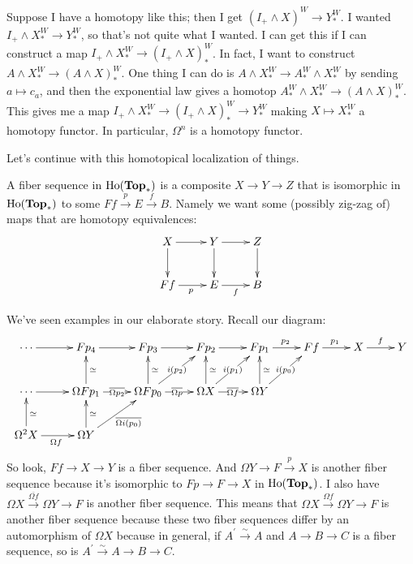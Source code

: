 Suppose I have a homotopy like this; then I get $(I_+\wedge X)^W\to Y^W_\ast$. I wanted $I_+\wedge X^W_\ast\to Y^W_\ast$, so that's not quite what I wanted. I can get this if I can construct a map $I_+\wedge X^W_\ast\to (I_+\wedge X)^W_\ast$. In fact, I want to construct $A\wedge X^W_\ast\to (A\wedge X)^W_\ast$. One thing I can do is $A\wedge X^W_\ast\to A^W_\ast\wedge X^W_\ast$ by sending $a\mapsto c_a$, and then the exponential law gives a homotop $A^W_\ast\wedge X^W_\ast\to (A\wedge X)^W_\ast$. This gives me a map $I_+\wedge X^W_\ast\to (I_+\wedge X)^W_\ast\to Y^W_\ast$ making $X\mapsto X^W_\ast$ a homotopy functor. In particular, $\Omega^n$ is a homotopy functor.

Let's continue with this homotopical localization of things.
\begin{definition}
    A fiber sequence in $\mathrm{Ho}(\mathbf{Top}_\ast)$ is a composite $X\to Y\to Z$ that is isomorphic in $\mathrm{Ho}(\mathbf{Top}_\ast)$ to some $Ff\xrightarrow{p} E\xrightarrow{f}B$. Namely we want some (possibly zig-zag of) maps that are homotopy equivalences:
    \begin{equation*}
	\xymatrix{
	    X\ar[r]\ar[d] & Y\ar[r]\ar[d] & Z\ar[d]\\
	    Ff\ar[r]_p & E\ar[r]_f & B
	    }
    \end{equation*}
\end{definition}
We've seen examples in our elaborate story. Recall our diagram:
\begin{equation*}
    \xymatrix{
	\cdots\ar[r] & Fp_4\ar[r] & Fp_3 \ar[r] & Fp_2\ar[r] & Fp_1\ar[r]^{p_2} & Ff\ar[r]^{p_1} & X\ar[r]^{f} & Y\\
    \cdots\ar[r] & \Omega Fp_1\ar[r]|{\overline{\Omega p_2}}\ar[u]_{\simeq} & \Omega Fp_0\ar[u]_{\simeq}\ar[ur]|{i(p_2)}\ar[r]|{\overline{\Omega p}} & \Omega X\ar[r]|{\overline{\Omega f}}\ar[u]_{\simeq}\ar[ur]|{i(p_1)} & \Omega Y\ar[u]_\simeq \ar[ur]|{i(p_0)} & &\\
	\Omega^2 X\ar[u]_{\simeq}\ar[r]_{\Omega f} & \Omega Y\ar[u]_{\simeq}\ar[ur]_{\overline{\Omega i(p_0)}} & & &
    }
\end{equation*}
So look, $Ff\to X\to Y$ is a fiber sequence. And $\Omega Y\to F\xrightarrow{p}X$ is another fiber sequence because it's isomorphic to $Fp\to F\to X$ in $\mathrm{Ho}(\mathbf{Top}_\ast)$. I also have $\Omega X\xrightarrow{\overline{\Omega f}}\Omega Y\to F$ is another fiber sequence. This means that $\Omega X\xrightarrow{\Omega f}\Omega Y\to F$ is another fiber sequence because these two fiber sequences differ by an automorphism of $\Omega X$ because in general, if $A^\prime\xrightarrow{\sim} A$ and $A\to B\to C$ is a fiber sequence, so is $A^\prime\xrightarrow{\sim} A\to B\to C$.

